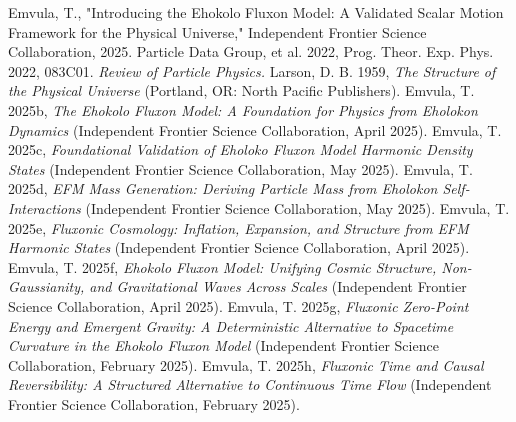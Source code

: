 \documentclass[11pt]{article}
\begin{document}
\begin{thebibliography}{9}
\raggedright
{} Emvula, T., "Introducing the Ehokolo Fluxon Model: A Validated Scalar Motion Framework for the Physical Universe," Independent Frontier Science Collaboration, 2025.
 Particle Data Group, et al. 2022, Prog. Theor. Exp. Phys. 2022, 083C01. 
\textit{Review of Particle Physics.}
 Larson, D. B. 1959, \textit{The Structure of the Physical Universe} (Portland, OR: North Pacific Publishers).
 Emvula, T. 2025b, \textit{The Ehokolo Fluxon Model: A Foundation for Physics from Eholokon Dynamics} (Independent Frontier Science Collaboration, April 2025).
 Emvula, T. 2025c, \textit{Foundational Validation of Eholoko Fluxon Model Harmonic Density States} (Independent Frontier Science Collaboration, May 2025).
 Emvula, T. 2025d, \textit{EFM Mass Generation: Deriving Particle Mass from Eholokon Self-Interactions} (Independent Frontier Science Collaboration, May 2025).
 Emvula, T. 2025e, \textit{Fluxonic Cosmology: Inflation, Expansion, and Structure from EFM Harmonic States} (Independent Frontier Science Collaboration, April 2025).
 Emvula, T. 2025f, \textit{Ehokolo Fluxon Model: Unifying Cosmic Structure, Non-Gaussianity, and Gravitational Waves Across Scales} (Independent Frontier Science Collaboration, April 2025).
 Emvula, T. 2025g, \textit{Fluxonic Zero-Point Energy and Emergent Gravity: A Deterministic Alternative to Spacetime Curvature in the Ehokolo Fluxon Model} (Independent Frontier Science Collaboration, February 2025).
 Emvula, T. 2025h, \textit{Fluxonic Time and Causal Reversibility: A Structured Alternative to Continuous Time Flow} (Independent Frontier Science Collaboration, February 2025).
\end{thebibliography}
\end{document}
